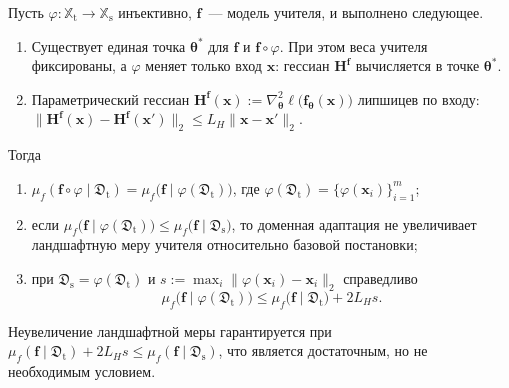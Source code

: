 \begin{theorem}\label{ch4:thm:phi-useful}
Пусть $\varphi:\mathbb{X}_{\text{t}}\to\mathbb{X}_{\text{s}}$ инъективно, $\mathbf{f}$~--- модель учителя, и выполнено следующее.
\begin{enumerate}[1)]
\item Существует единая точка $\boldsymbol{\theta}^*$ для $\mathbf{f}$ и $\mathbf{f}\circ\varphi$. При этом веса учителя фиксированы, а $\varphi$ меняет только вход $\mathbf{x}$: гессиан $\mathbf{H}^{\mathbf{f}}$ вычисляется в точке $\boldsymbol{\theta}^*$.
\item Параметрический гессиан $\mathbf{H}^{\mathbf{f}}(\mathbf{x}):=\nabla^2_{\boldsymbol{\theta}}\ell\bigl(\mathbf{f}_{\boldsymbol{\theta}}(\mathbf{x})\bigr)$ липшицев по входу: $\bigl\|\mathbf{H}^{\mathbf{f}}(\mathbf{x})-\mathbf{H}^{\mathbf{f}}(\mathbf{x}')\bigr\|_2\le L_H\|\mathbf{x}-\mathbf{x}'\|_2$.
\end{enumerate}
Тогда
\begin{enumerate}[1)]
\item $\mu_f(\mathbf{f}\circ\varphi\mid\mathfrak{D}_{\text{t}})=\mu_f\bigl(\mathbf{f}\mid\varphi(\mathfrak{D}_{\text{t}})\bigr)$, где $\varphi(\mathfrak{D}_{\text{t}})=\{\varphi(\mathbf{x}_i)\}_{i=1}^{m}$;
\item если $\mu_f\bigl(\mathbf{f}\mid\varphi(\mathfrak{D}_{\text{t}})\bigr)\le\mu_f\bigl(\mathbf{f}\mid\mathfrak{D}_{\text{s}}\bigr)$, то доменная адаптация не увеличивает ландшафтную меру учителя относительно базовой постановки;
\item при $\mathfrak{D}_{\text{s}}=\varphi(\mathfrak{D}_{\text{t}})$ и $s:=\max_i\|\varphi(\mathbf{x}_i)-\mathbf{x}_i\|_2$ справедливо
\begin{equation}\label{ch4:eq:phi-shift}
  \mu_f\bigl(\mathbf{f}\mid\varphi(\mathfrak{D}_{\text{t}})\bigr)\le\mu_f\bigl(\mathbf{f}\mid\mathfrak{D}_{\text{t}}\bigr)+2L_H s .
\end{equation}
\end{enumerate}
Неувеличение ландшафтной меры гарантируется при $\mu_f(\mathbf{f}\mid\mathfrak{D}_{\text{t}})+2L_Hs\le\mu_f(\mathbf{f}\mid\mathfrak{D}_{\text{s}})$, что является достаточным, но не необходимым условием.
\end{theorem}

